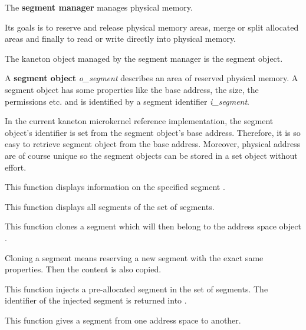 The \textbf{segment manager} manages physical memory.

Its goals is to reserve and release physical memory areas, merge or split
allocated areas and finally to read or write directly into physical memory.

The kaneton object managed by the segment manager is the segment object.

A \textbf{segment object} \textit{o\_segment} describes an area of reserved
physical memory. A segment object has some properties like the base
address, the size, the permissions etc. and is identified by a
segment identifier \textit{i\_segment}.

In the current kaneton microkernel reference implementation, the
segment object's identifier is set from the segment object's base
address. Therefore, it is so easy to retrieve segment object from
the base address. Moreover, physical address are of course unique
so the segment objects can be stored in a set object without effort.


	 {
	   This function displays information on the specified segment
	   .
	 }

	 {
	   This function displays all segments of the set of segments.
	 }

	 {
	   This function clones a segment which will then belong to
	   the address space object .

	   Cloning a segment means reserving a new segment with the
	   exact same properties. Then the content is also copied.
	 }

	 {
	   This function injects a pre-allocated segment in the set of
	   segments. The identifier of the injected segment is returned into
	   .

	 }

	 {
	   This function gives a segment from one address space to another.
	 }

